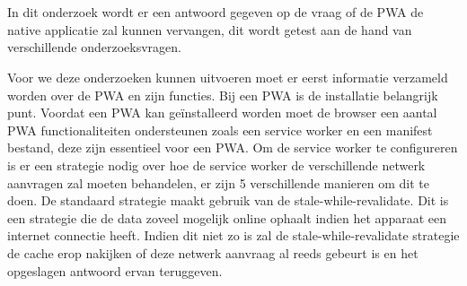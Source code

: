 
%
%

%



\chapter*{}
In dit onderzoek wordt er een antwoord gegeven op de vraag of de PWA de native applicatie zal kunnen vervangen, dit wordt getest aan de hand van verschillende onderzoeksvragen.

Voor we deze onderzoeken kunnen uitvoeren moet er eerst informatie verzameld worden over de PWA en zijn functies. Bij een PWA is de installatie belangrijk punt. Voordat een PWA kan geïnstalleerd worden moet de browser een aantal PWA functionaliteiten ondersteunen zoals een service worker en een manifest bestand, deze zijn essentieel voor een PWA. Om de service worker te configureren is er een strategie nodig over hoe de service worker de verschillende netwerk aanvragen zal moeten behandelen, er zijn 5 verschillende manieren om dit te doen. De standaard strategie maakt gebruik van de stale-while-revalidate. Dit is een strategie die de data zoveel mogelijk online ophaalt indien het apparaat een internet connectie heeft. Indien dit niet zo is zal de stale-while-revalidate strategie de cache erop nakijken of deze netwerk aanvraag al reeds gebeurt is en het opgeslagen antwoord ervan teruggeven.

